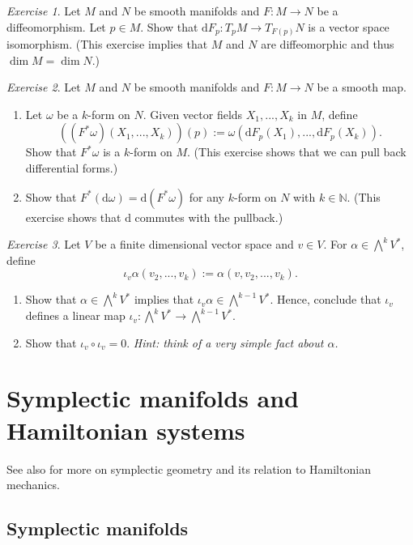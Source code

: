 \documentclass[12pt]{amsart}
\numberwithin{equation}{section}
\theoremstyle{plain}
\theoremstyle{definition}
\theoremstyle{remark}
\newtheorem{exe}{Exercise}[subsection]
\newcommand{\N}{\mathbb{N}}
\newcommand{\dd}{{\mathrm{d}}}
\begin{document}
\begin{exe}
Let $M$ and $N$ be smooth manifolds and $F\colon M\to N$ be a diffeomorphism. Let $p\in M$. Show that $\dd F_p\colon T_pM\to T_{F(p)}N$ is a vector space isomorphism. (This exercise implies that $M$ and $N$ are diffeomorphic and thus $\dim M=\dim N$.)
\end{exe}

\begin{exe}
Let $M$ and $N$ be smooth manifolds and $F\colon M\to N$ be a smooth map. 
\begin{enumerate}
\item{Let $\omega$ be a $k$-form on $N$. Given vector fields $X_1,...,X_k$ in $M$, define 
$$((F^*\omega)(X_1,...,X_k))(p):=\omega(\dd F_p(X_1),...,\dd F_p(X_k)).$$
Show that $F^*\omega$ is a $k$-form on $M$. (This exercise shows that we can pull back differential forms.)
}
\item{Show that $F^*(\dd \omega)=\dd(F^*\omega)$ for any $k$-form on $N$ with $k\in\N$. (This exercise shows that $\dd$ commutes with the pullback.)
}
\end{enumerate}
\end{exe}


\begin{exe}
Let $V$ be a finite dimensional vector space and $v\in V$. For $\alpha\in\bigwedge^kV^*$, define 
$$\iota_v\alpha(v_2,...,v_k):=\alpha(v,v_2,...,v_k).$$
\begin{enumerate}
\item{Show that $\alpha\in\bigwedge^k V^*$ implies that $\iota_v\alpha\in \bigwedge^{k-1}V^*$. Hence, conclude that $\iota_v$ defines a linear map $\iota_v\colon \bigwedge^kV^*\to \bigwedge^{k-1}V^*$.
}
\item{Show that $\iota_v\circ \iota_v=0$. \emph{Hint: think of a very simple fact about $\alpha$.}
}
\end{enumerate}
\end{exe}


\section{Symplectic manifolds and Hamiltonian systems}
See also \cite{daSilva01} for more on symplectic geometry and its relation to Hamiltonian mechanics.

\subsection{Symplectic manifolds}
\end{document}
